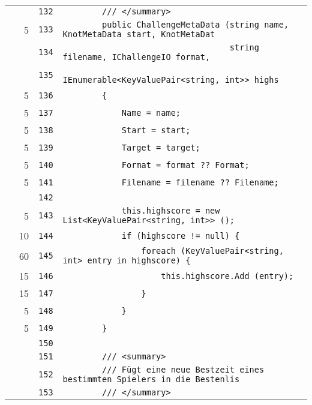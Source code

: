 \documentclass[a4paper,10pt]{article}
\begin{document}
\begin{longtable}[l]{lrrl}
\cellcolor{gray} &  & \verb~132~ & \verb~        /// </summary>~\\
\cellcolor{green} & 5 & \verb~133~ & \verb~        public ChallengeMetaData (string name, KnotMetaData start, KnotMetaDat~\\
\cellcolor{gray} &  & \verb~134~ & \verb~                                  string filename, IChallengeIO format,~\\
\cellcolor{gray} &  & \verb~135~ & \verb~                                  IEnumerable<KeyValuePair<string, int>> highs~\\
\cellcolor{green} & 5 & \verb~136~ & \verb~        {~\\
\cellcolor{green} & 5 & \verb~137~ & \verb~            Name = name;~\\
\cellcolor{green} & 5 & \verb~138~ & \verb~            Start = start;~\\
\cellcolor{green} & 5 & \verb~139~ & \verb~            Target = target;~\\
\cellcolor{green} & 5 & \verb~140~ & \verb~            Format = format ?? Format;~\\
\cellcolor{green} & 5 & \verb~141~ & \verb~            Filename = filename ?? Filename;~\\
\cellcolor{gray} &  & \verb~142~ & \verb~~\\
\cellcolor{green} & 5 & \verb~143~ & \verb~            this.highscore = new List<KeyValuePair<string, int>> ();~\\
\cellcolor{green} & 10 & \verb~144~ & \verb~            if (highscore != null) {~\\
\cellcolor{green} & 60 & \verb~145~ & \verb~                foreach (KeyValuePair<string, int> entry in highscore) {~\\
\cellcolor{green} & 15 & \verb~146~ & \verb~                    this.highscore.Add (entry);~\\
\cellcolor{green} & 15 & \verb~147~ & \verb~                }~\\
\cellcolor{green} & 5 & \verb~148~ & \verb~            }~\\
\cellcolor{green} & 5 & \verb~149~ & \verb~        }~\\
\cellcolor{gray} &  & \verb~150~ & \verb~~\\
\cellcolor{gray} &  & \verb~151~ & \verb~        /// <summary>~\\
\cellcolor{gray} &  & \verb~152~ & \verb~        /// Fügt eine neue Bestzeit eines bestimmten Spielers in die Bestenlis~\\
\cellcolor{gray} &  & \verb~153~ & \verb~        /// </summary>~\\

\end{longtable}
\end{document}

